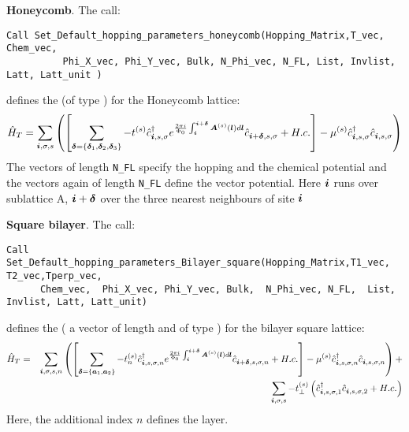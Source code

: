 \noindent
 \textbf{Honeycomb}.     The call: 
 \begin{lstlisting}[style=fortran]
 Call Set_Default_hopping_parameters_honeycomb(Hopping_Matrix,T_vec, Chem_vec, 
          Phi_X_vec, Phi_Y_vec, Bulk, N_Phi_vec, N_FL, List, Invlist, Latt, Latt_unit )
\end{lstlisting}
defines  the   (of type  )    for the  Honeycomb lattice: 
\begin{equation}
\hat{H}_T  =   \sum_{\boldsymbol{i}, \sigma, s}  \left( \left[ \sum_{ \boldsymbol{\delta} = \left\{ \boldsymbol{\delta}_1, \boldsymbol{\delta}_2, \boldsymbol{\delta}_3\right\} }    - t^{(s)} \hat{c}^{\dagger}_{\boldsymbol{i},s,\sigma}   e^{\frac{2 \pi i}{\Phi_0} \int_{\boldsymbol{i}}^{\boldsymbol{i}+ \boldsymbol{\delta}}  \boldsymbol{A}^{(s)}(\boldsymbol{l})  d \boldsymbol{l}}   \hat{c}^{}_{\boldsymbol{i} + \boldsymbol{\delta},s,\sigma} +  H.c.  \right]      -  \mu^{(s)} \hat{c}^{\dagger}_{\boldsymbol{i},s,\sigma} \hat{c}^{}_{\boldsymbol{i},s,\sigma}  \right) 
\end{equation}
The vectors   of  length \texttt{N\_FL}    specify the hopping and the chemical potential   and the  vectors 
  again of  length  \texttt{N\_FL}    define the vector potential.    Here $\boldsymbol{i}$  runs over  sublattice  A,     
$\boldsymbol{i} + \boldsymbol{\delta}$    over the three nearest neighbours of site $\boldsymbol{i}$


\noindent
\textbf{Square bilayer}.     The call:
 \begin{lstlisting}[style=fortran]
Call  Set_Default_hopping_parameters_Bilayer_square(Hopping_Matrix,T1_vec, T2_vec,Tperp_vec, 
      Chem_vec,  Phi_X_vec, Phi_Y_vec, Bulk,  N_Phi_vec, N_FL,  List, Invlist, Latt, Latt_unit)
\end{lstlisting}  
defines  the   (  a vector of length   and of type  )    for the  bilayer  square  lattice:                 
\begin{eqnarray}
\hat{H}_T  =  & &   \sum_{\boldsymbol{i}, \sigma, s,n } \left(    \left[  \sum_{ \boldsymbol{\delta} = \left\{ \boldsymbol{a}_1, \boldsymbol{a}_2\right\} }  - t_n^{(s)} \hat{c}^{\dagger}_{\boldsymbol{i},s,\sigma,n}   e^{\frac{2 \pi i}{\Phi_0} \int_{\boldsymbol{i}}^{\boldsymbol{i}+ \boldsymbol{\delta}}  \boldsymbol{A}^{(s)}(\boldsymbol{l})  d \boldsymbol{l}}   \hat{c}^{}_{\boldsymbol{i} + \boldsymbol{\delta},s,\sigma,n} +  H.c. \right]       -  \mu^{(s)} \hat{c}^{\dagger}_{\boldsymbol{i},s,\sigma,n} \hat{c}^{}_{\boldsymbol{i},s,\sigma,n}  \right)  +  \nonumber \\
      & &    \sum_{\boldsymbol{i}, \sigma, s } -  t_{\perp}^{(s)}  \left( \hat{c}^{\dagger}_{\boldsymbol{i},s,\sigma,1} \hat{c}^{}_{\boldsymbol{i},s,\sigma,2}    + H.c.  \right) 
\end{eqnarray}
Here, the additional  index  $n$  defines the   layer.  

